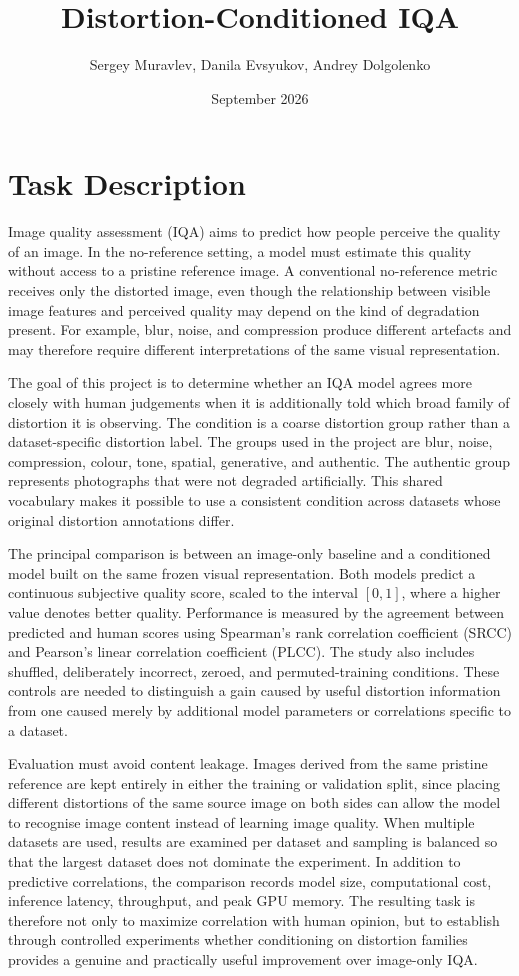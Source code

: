 \documentclass{article}
\title{Distortion-Conditioned IQA}
\author{Sergey Muravlev, Danila Evsyukov, Andrey Dolgolenko}
\date{September 2026}
\begin{document}
\maketitle

\section{Task Description}

Image quality assessment (IQA) aims to predict how people perceive the quality of an image. In the no-reference setting, a model must estimate this quality without access to a pristine reference image. A conventional no-reference metric receives only the distorted image, even though the relationship between visible image features and perceived quality may depend on the kind of degradation present. For example, blur, noise, and compression produce different artefacts and may therefore require different interpretations of the same visual representation.

The goal of this project is to determine whether an IQA model agrees more closely with human judgements when it is additionally told which broad family of distortion it is observing. The condition is a coarse distortion group rather than a dataset-specific distortion label. The groups used in the project are blur, noise, compression, colour, tone, spatial, generative, and authentic. The authentic group represents photographs that were not degraded artificially. This shared vocabulary makes it possible to use a consistent condition across datasets whose original distortion annotations differ.

The principal comparison is between an image-only baseline and a conditioned model built on the same frozen visual representation. Both models predict a continuous subjective quality score, scaled to the interval $[0,1]$, where a higher value denotes better quality. Performance is measured by the agreement between predicted and human scores using Spearman's rank correlation coefficient (SRCC) and Pearson's linear correlation coefficient (PLCC). The study also includes shuffled, deliberately incorrect, zeroed, and permuted-training conditions. These controls are needed to distinguish a gain caused by useful distortion information from one caused merely by additional model parameters or correlations specific to a dataset.

Evaluation must avoid content leakage. Images derived from the same pristine reference are kept entirely in either the training or validation split, since placing different distortions of the same source image on both sides can allow the model to recognise image content instead of learning image quality. When multiple datasets are used, results are examined per dataset and sampling is balanced so that the largest dataset does not dominate the experiment. In addition to predictive correlations, the comparison records model size, computational cost, inference latency, throughput, and peak GPU memory. The resulting task is therefore not only to maximize correlation with human opinion, but to establish through controlled experiments whether conditioning on distortion families provides a genuine and practically useful improvement over image-only IQA.
\end{document}
